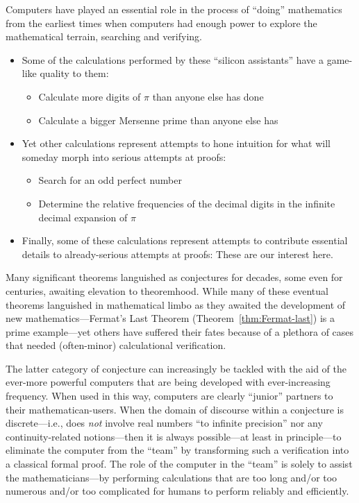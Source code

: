 Computers have played an essential role in the process of ``doing'' mathematics from the earliest times when computers had enough power to explore the mathematical terrain, searching and verifying.
\begin{itemize}
\item
Some of the calculations performed by these ``silicon assistants'' have a game-like quality to them:
  \begin{itemize}
  \item
Calculate more digits of $\pi$ than anyone else has done
  \item
Calculate a bigger Mersenne prime than anyone else has
  \end{itemize}

\item
Yet other calculations represent attempts to hone intuition for what will someday morph into serious attempts at proofs:
  \begin{itemize}
  \item
Search for an odd perfect number
  \item
Determine the relative frequencies of the decimal digits in the infinite decimal expansion of $\pi$
  \end{itemize}

\item
Finally, some of these calculations represent attempts to contribute
essential details to already-serious attempts at proofs: These are our
interest here.
\end{itemize}

Many significant theorems languished as conjectures for decades, some even for centuries, awaiting elevation to theoremhood.  While many of these eventual theorems languished in mathematical limbo as they awaited the development of new mathematics---Fermat's Last Theorem (Theorem~\ref{thm:Fermat-last}) is a prime example---yet others have suffered their fates because of a plethora of cases that needed (often-minor) calculational verification.

The latter category of conjecture can increasingly be tackled with the aid of the ever-more powerful computers that are being developed with ever-increasing frequency.  When used in this way, computers are clearly ``junior'' partners to their mathematican-users.  When the domain of discourse within a conjecture is discrete---i.e., does {\em not} involve real numbers ``to infinite precision'' nor any continuity-related notions---then it is always possible---at least in principle---to eliminate the computer from the ``team'' by transforming such a verification into a classical formal proof.  The role of the computer in the ``team'' is solely to assist the mathematicians---by
performing calculations that are too long and/or too numerous and/or too complicated for humans to perform reliably and efficiently.

